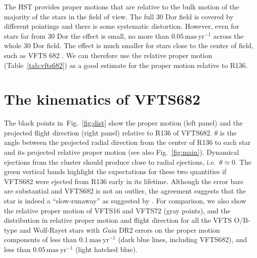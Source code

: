 \documentclass[apjl,twocolumn]{emulateapj}
\newcommand{\masyr}{\,\mathrm{mas}\,\mathrm{yr}^{-1}}
\DeclareRobustCommand{\Figref}[1]{Fig.~\ref{#1}}
\DeclareRobustCommand{\Tabref}[1]{Table~\ref{#1}}
\begin{document}
The HST provides proper motions that are relative to the bulk motion
of the majority of the stars in the field of view. The full 30 Dor
field is covered by different pointings and there is some systematic
distortion.  However, even for stars far from 30 Dor the effect is
small, no more than $0.05\masyr$ across the whole 30 Dor field. The
effect is much smaller for stars close to the center of field, such as
VFTS 682 \citep{platais:18}.  We can therefore use the relative proper
motion (\Tabref{tab:vfts682}) as a good estimate for the proper motion relative to R136. 
 

\section{The kinematics of VFTS682}
\label{sec:results}

The black points in~\Figref{fig:dist} show the proper motion 
(left panel) and the projected flight direction (right panel) relative
to R136 of
VFTS682. $\theta$ is the angle between the projected radial direction from the
center of R136 to each star and its projected relative proper motion
(see also \Figref{fig:main}). Dynamical ejections from the
cluster should %
produce
close to radial ejections, i.e.~$\theta\simeq0$. The green vertical bands highlight the expectations for these
two quantities if VFTS682 were ejected from R136 early in its
lifetime. Although the error bars are substantial and VFTS682 is not
an outlier, the agreement
suggests that the star is indeed a ``slow-runaway'' as suggested by
\cite{bestenlehner:11}. For comparison, we also show the relative
proper motion of VFTS16 and VFTS72 (gray points), and the distribution
in relative proper motion and flight direction for all the VFTS O/B-type and Wolf-Rayet stars with
\emph{Gaia} DR2 errors on the proper motion
components of less than $0.1\,\mathrm{mas\ yr^{-1}}$ (dark blue lines,
including VFTS682), and less than $0.05\,\mathrm{mas\ yr^{-1}}$ (light hatched
blue).


\end{document}

